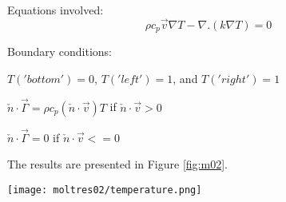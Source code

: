 \documentclass[11pt,letterpaper]{article}
\begin{document}
Equations involved:
\begin{equation}
\rho c_{p}\vec{v}\nabla T-\nabla.(k\nabla T)=0
\end{equation}

Boundary conditions:
\begin{description}[]
	\item[] $T('bottom')=0$, $T('left')=1$, and $T('right')=1$
	\item[] $\check{n}\cdot\vec{\Gamma}=\rho c_{p}(\check{n}\cdot\vec{v})T$ if $\check{n}\cdot\vec{v}>0$
	\item[] $\check{n}\cdot\vec{\Gamma}=0$ if $\check{n}\cdot\vec{v}<=0$
\end{description}

The results are presented in Figure \ref{fig:m02}.
\begin{figure*}[!h]
	\centering
	\texttt{[image: moltres02/temperature.png]} 
	\hfill
	\caption{Temperature.}
	\label{fig:m02}
\end{figure*}
\end{document}
